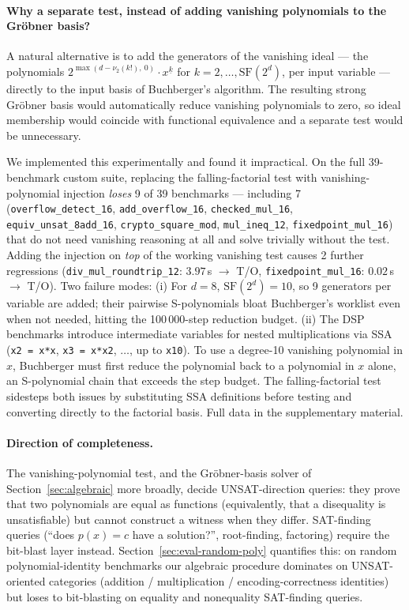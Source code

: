 \documentclass[runningheads]{llncs}
\begin{document}
\paragraph{Why a separate test, instead of adding vanishing
polynomials to the Gr\"obner basis?}
A natural alternative is to add the generators of the vanishing
ideal --- the polynomials
$2^{\max(d - \nu_2(k!),\ 0)} \cdot x^{\underline{k}}$ for
$k = 2, \ldots, \mathrm{SF}(2^d)$, per input variable --- directly
to the input basis of Buchberger's algorithm. The resulting strong
Gr\"obner basis would automatically reduce vanishing polynomials to
zero, so ideal membership would coincide with functional
equivalence and a separate test would be unnecessary.

We implemented this experimentally and found it impractical. On
the full 39-benchmark custom suite, replacing the falling-factorial
test with vanishing-polynomial injection \emph{loses} 9 of 39
benchmarks --- including 7
(\texttt{overflow\_detect\_16}, \texttt{add\_overflow\_16},
\texttt{checked\_mul\_16}, \texttt{equiv\_unsat\_8add\_16},
\texttt{crypto\_square\_mod}, \texttt{mul\_ineq\_12},
\texttt{fixedpoint\_mul\_16}) that do not need vanishing reasoning
at all and solve trivially without the test. Adding the injection
on \emph{top} of the working vanishing test causes 2 further
regressions
(\texttt{div\_mul\_roundtrip\_12}: $3.97\,$s $\to$ T/O,
\texttt{fixedpoint\_mul\_16}: $0.02\,$s $\to$ T/O). Two failure modes:
(i) For $d = 8$, $\mathrm{SF}(2^d) = 10$, so 9 generators per
variable are added; their pairwise S-polynomials bloat
Buchberger's worklist even when not needed, hitting the
100\,000-step reduction budget.
(ii) The DSP benchmarks introduce intermediate variables for
nested multiplications via SSA (\texttt{x2 = x*x}, \texttt{x3 =
x*x2}, $\ldots$, up to \texttt{x10}). To use a degree-10 vanishing
polynomial in $x$, Buchberger must first reduce the polynomial
back to a polynomial in $x$ alone, an S-polynomial chain that
exceeds the step budget. The falling-factorial test sidesteps
both issues by substituting SSA definitions before testing and
converting directly to the factorial basis. Full data in the
supplementary material.

\paragraph{Direction of completeness.}
The vanishing-polynomial test, and the Gr\"obner-basis solver
of Section~\ref{sec:algebraic} more broadly, decide UNSAT-direction
queries: they prove that two polynomials are equal as functions
(equivalently, that a disequality is unsatisfiable) but cannot
construct a witness when they differ. SAT-finding queries
(``does $p(x) = c$ have a solution?'', root-finding, factoring)
require the bit-blast layer instead. Section~\ref{sec:eval-random-poly}
quantifies this: on random polynomial-identity benchmarks our
algebraic procedure dominates on UNSAT-oriented categories
(addition / multiplication / encoding-correctness identities) but
loses to bit-blasting on equality and nonequality SAT-finding
queries.
\end{document}

